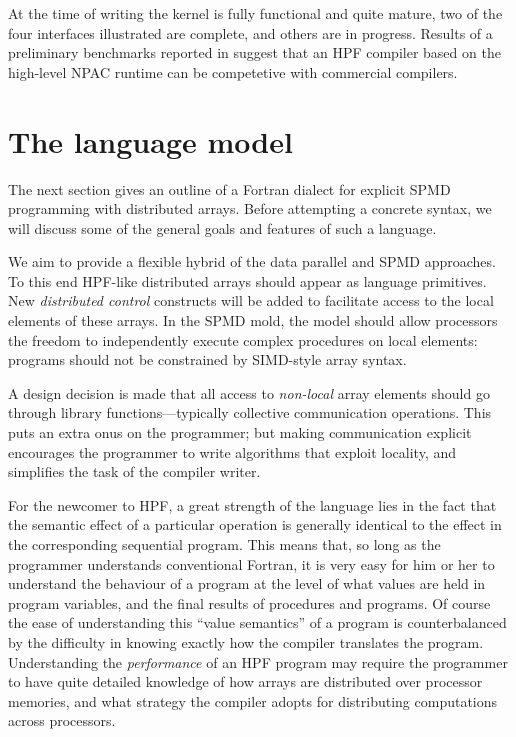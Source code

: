 At the time of writing the kernel is fully functional and quite mature,
two of the four interfaces illustrated are complete, and others are
in progress.  Results of a preliminary benchmarks reported in
\cite{PCRC_based} suggest that an HPF compiler based on the high-level
NPAC runtime can be competetive with commercial compilers.

\section{The language model}

The next section gives an outline of a Fortran dialect for
explicit SPMD programming with distributed arrays.  Before attempting a
concrete syntax, we will discuss some of the general goals and
features of such a language.

We aim to provide a flexible hybrid of the data
parallel and SPMD approaches.  To this end HPF-like distributed arrays
should appear as language primitives.  New {\em distributed control}
constructs will be added to facilitate access to the local elements of
these arrays.  In the SPMD mold, the model should allow processors the
freedom to independently execute complex procedures on local elements:
programs should not be constrained by SIMD-style array syntax.

A design decision is made that all access to {\em non-local} array
elements should go through library functions---typically collective
communication operations.  This puts an extra onus on the programmer;
but making communication explicit encourages the programmer to write
algorithms that exploit locality, and simplifies the task of the
compiler writer.

For the newcomer to HPF, a great strength of the language lies in the
fact that the semantic effect of a particular operation is generally
identical to the effect in the corresponding sequential program.  This
means that, so long as the programmer understands conventional Fortran,
it is very easy for him or her to understand the behaviour of a program
at the level of what values are held in program variables,
and the final results of procedures and programs.  Of course the
ease of understanding this ``value semantics'' of a program is
counterbalanced by the difficulty in knowing exactly how the compiler
translates the program.  Understanding the {\em performance} of an HPF
program may require the programmer to have quite detailed
knowledge of how arrays are distributed over processor memories,
and what strategy the compiler adopts for distributing computations
across processors.


